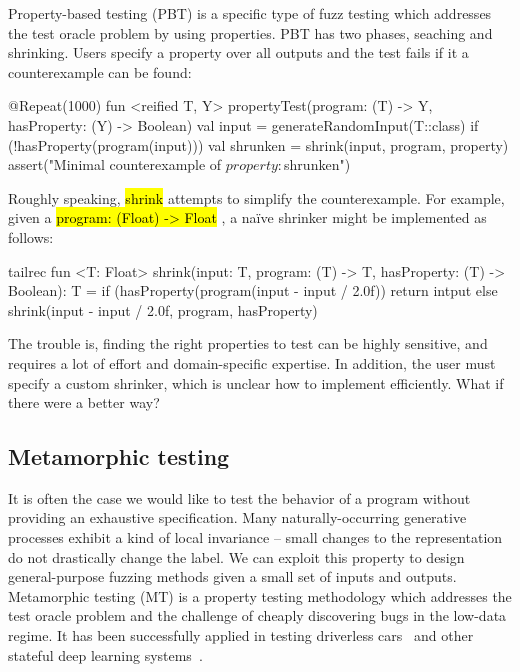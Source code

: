 \documentclass[12pt,initial,twoside,maitrise]{dms}
\newcommand{\inline}[1]{%
\begingroup%
\sethlcolor{slightgray}%
\hl{\ttfamily\small #1}%
\endgroup
}
\numberwithin{equation}{section}
\numberwithin{table}{chapter}
\numberwithin{figure}{chapter}
\begin{document}
Property-based testing (PBT) is a specific type of fuzz testing which addresses the test oracle problem by using properties. PBT has two phases, seaching and shrinking. Users specify a property over all outputs and the test fails if it a counterexample can be found:
%
\begin{kotlinlisting}
@Repeat(1000)
fun <reified T, Y> propertyTest(program: (T) -> Y, hasProperty: (Y) -> Boolean) {
    val input = generateRandomInput(T::class)
    if (!hasProperty(program(input))) {
        val shrunken = shrink(input, program, property)
        assert("Minimal counterexample of $property: $shrunken")
    }
}
\end{kotlinlisting}
%
Roughly speaking, \inline{shrink} attempts to simplify the counterexample. For example, given a \inline{program: (Float) -> Float}, a na\"ive shrinker might be implemented as follows:
%
\begin{kotlinlisting}
tailrec fun <T: Float> shrink(input: T, program: (T) -> T, hasProperty: (T) -> Boolean): T =
    if (hasProperty(program(input - input / 2.0f)) return intput
    else shrink(input - input / 2.0f, program, hasProperty)
\end{kotlinlisting}
%
The trouble is, finding the right properties to test can be highly sensitive, and requires a lot of effort and domain-specific expertise. In addition, the user must specify a custom shrinker, which is unclear how to implement efficiently. What if there were a better way?

\subsection{Metamorphic testing}\label{subsec:metamorphic-testing}

It is often the case we would like to test the behavior of a program without providing an exhaustive specification. Many naturally-occurring generative processes exhibit a kind of local invariance -- small changes to the representation do not drastically change the label. We can exploit this property to design general-purpose fuzzing methods given a small set of inputs and outputs. Metamorphic testing (MT) is a property testing methodology which addresses the test oracle problem and the challenge of cheaply discovering bugs in the low-data regime. It has been successfully applied in testing driverless cars~\citep{zhou2019metamorphic, pei2017deepxplore, tian2018deeptest} and other stateful deep learning systems~\citep{du2018deepcruiser}.
\end{document}

